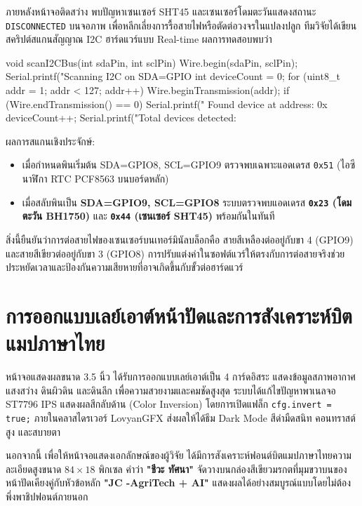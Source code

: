 ภายหลังหน้าจอติดสว่าง พบปัญหาเซนเซอร์ SHT45 และเซนเซอร์โดมตะวันแสดงสถานะ \texttt{DISCONNECTED} บนจอภาพ เพื่อหลีกเลี่ยงการรื้อสายไฟหรือตัดต่อวงจรในแปลงปลูก ทีมวิจัยได้เขียนสคริปต์สแกนสัญญาณ I2C ฮาร์ดแวร์แบบ Real-time ผลการทดสอบพบว่า

\begin{pythonbox}
void scanI2CBus(int sdaPin, int sclPin) {
    Wire.begin(sdaPin, sclPin);
    Serial.printf("Scanning I2C on SDA=GPIO%
    int deviceCount = 0;
    for (uint8_t addr = 1; addr < 127; addr++) {
        Wire.beginTransmission(addr);
        if (Wire.endTransmission() == 0) {
            Serial.printf("  Found device at address: 0x%
            deviceCount++;
        }
    }
    Serial.printf("Total devices detected: %
}
\end{pythonbox}

ผลการสแกนเชิงประจักษ์:
\begin{itemize}
    \item เมื่อกำหนดพินเริ่มต้น SDA=GPIO8, SCL=GPIO9 ตรวจพบเฉพาะแอดเดรส \texttt{0x51} (ไอซีนาฬิกา RTC PCF8563 บนบอร์ดหลัก)
    \item เมื่อสลับพินเป็น \textbf{SDA=GPIO9, SCL=GPIO8} ระบบตรวจพบแอดเดรส \textbf{\texttt{0x23} (โดมตะวัน BH1750)} และ \textbf{\texttt{0x44} (เซนเซอร์ SHT45)} พร้อมกันในทันที
\end{itemize}

สิ่งนี้ยืนยันว่าการต่อสายไฟของเซนเซอร์บนเทอร์มินัลบล็อกคือ สายสีเหลืองต่ออยู่กับขา 4 (GPIO9) และสายสีเขียวต่ออยู่กับขา 3 (GPIO8) การปรับแต่งค่าในซอฟต์แวร์ให้ตรงกับการต่อสายจริงช่วยประหยัดเวลาและป้องกันความเสียหายที่อาจเกิดขึ้นกับขั้วต่อฮาร์ดแวร์

\section{การออกแบบเลย์เอาต์หน้าปัดและการสังเคราะห์บิตแมปภาษาไทย}

หน้าจอแสดงผลขนาด 3.5 นิ้ว ได้รับการออกแบบเลย์เอาต์เป็น 4 การ์ดอิสระ แสดงข้อมูลสภาพอากาศ แสงสว่าง ดินผิวดิน และดินลึก เพื่อความสวยงามและคมชัดสูงสุด ระบบได้แก้ไขปัญหาพาเนลจอ ST7796 IPS แสดงผลสีกลับด้าน (Color Inversion) โดยการเปิดแฟล็ก \texttt{cfg.invert = true;} ภายในคลาสไดรเวอร์ LovyanGFX ส่งผลให้ได้ธีม Dark Mode สีดำมืดสนิท คอนทราสต์สูง และสบายตา

นอกจากนี้ เพื่อให้หน้าจอแสดงเอกลักษณ์ของผู้วิจัย ได้มีการสังเคราะห์ฟอนต์บิตแมปภาษาไทยความละเอียดสูงขนาด $84 \times 18$ พิกเซล คำว่า \textbf{"ชีวะ  ทัศนา"} จัดวางบนกล่องสีเขียวมรกตที่มุมขวาบนของหน้าปัดเคียงคู่กับหัวข้อหลัก \textbf{"JC -AgriTech + AI"} แสดงผลได้อย่างสมบูรณ์แบบโดยไม่ต้องพึ่งพาชิปฟอนต์ภายนอก

